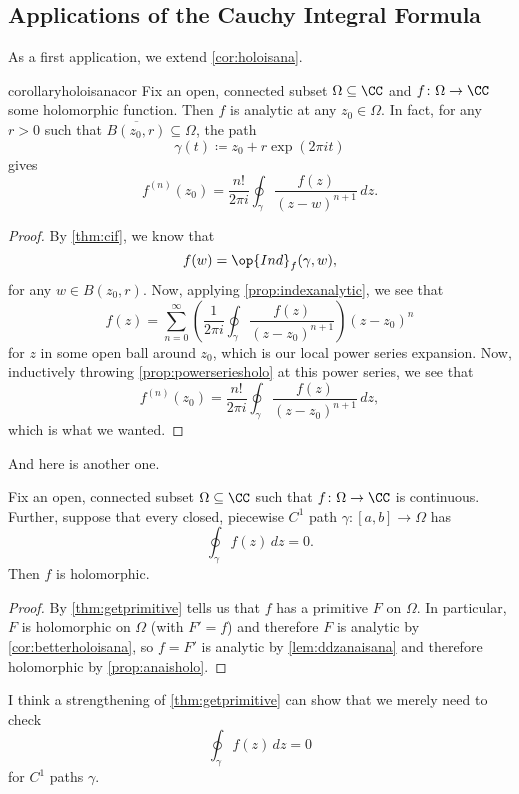 \subsection{Applications of the Cauchy Integral Formula}
As a first application, we extend \autoref{cor:holoisana}.
\begin{restatable}{corollary}{holoisanacor} \label{cor:betterholoisana}
	Fix an open, connected subset $\Omega\subseteq\CC$ and $f\colon \Omega\to\CC$ some holomorphic function. Then $f$ is analytic at any $z_0\in\Omega$. In fact, for any $r>0$ such that $\overline{B(z_0,r)}\subseteq\Omega$, the path
	\[\gamma(t)\coloneqq z_0+r\exp(2\pi it)\]
	gives
	\[f^{(n)}(z_0)=\frac{n!}{2\pi i}\oint_\gamma\frac{f(z)}{(z-w)^{n+1}}\,dz.\]
\end{restatable}
\begin{proof}
	By \autoref{thm:cif}, we know that
	\[f(w)=\op{Ind}_f(\gamma,w),\]
	for any $w\in B(z_0,r)$. Now, applying \autoref{prop:indexanalytic}, we see that 
	\[f(z)=\sum_{n=0}^\infty\left(\frac1{2\pi i}\oint_\gamma\frac{f(z)}{(z-z_0)^{n+1}}\right)(z-z_0)^n\]
	for $z$ in some open ball around $z_0$, which is our local power series expansion. Now, inductively throwing \autoref{prop:powerseriesholo} at this power series, we see that
	\[f^{(n)}(z_0)=\frac{n!}{2\pi i}\oint_\gamma\frac{f(z)}{(z-z_0)^{n+1}}\,dz,\]
	which is what we wanted.
\end{proof}
And here is another one.
\begin{theorem}[Morera] \label{thm:morera}
	Fix an open, connected subset $\Omega\subseteq\CC$ such that $f\colon \Omega\to\CC$ is continuous. Further, suppose that every closed, piecewise $C^1$ path $\gamma\colon [a,b]\to\Omega$ has
	\[\oint_\gamma f(z)\,dz=0.\]
	Then $f$ is holomorphic.
\end{theorem}
\begin{proof}
	By \autoref{thm:getprimitive} tells us that $f$ has a primitive $F$ on $\Omega$. In particular, $F$ is holomorphic on $\Omega$ (with $F'=f$) and therefore $F$ is analytic by \autoref{cor:betterholoisana}, so $f=F'$ is analytic by \autoref{lem:ddzanaisana} and therefore holomorphic by \autoref{prop:anaisholo}.
\end{proof}
\begin{remark}
	I think a strengthening of \autoref{thm:getprimitive} can show that we merely need to check
	\[\oint_\gamma f(z)\,dz=0\]
	for $C^1$ paths $\gamma$.
\end{remark}

